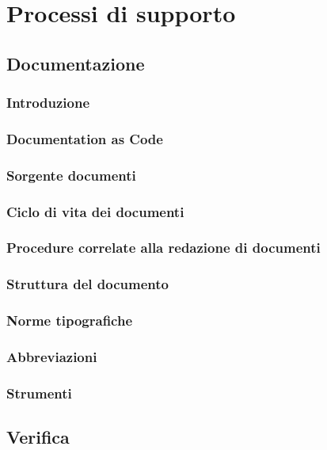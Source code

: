 \section{Processi di supporto}
\subsection{Documentazione}
\subsubsection{Introduzione}
\subsubsection{Documentation as Code}
\subsubsection{Sorgente documenti}
\subsubsection{Ciclo di vita dei documenti}
\subsubsection{Procedure correlate alla redazione di documenti}
\subsubsection{Struttura del documento}
\subsubsection{Norme tipografiche}
\subsubsection{Abbreviazioni}
\subsubsection{Strumenti}
\subsection{Verifica}
